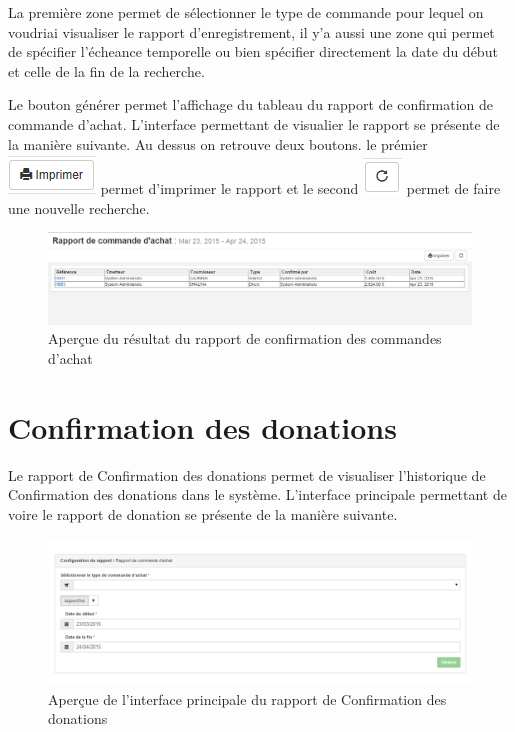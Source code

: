 \documentclass[12pt,a4paper]{report}
\begin{document}
La première zone permet de sélectionner le type de commande pour lequel on voudriai visualiser le rapport d'enregistrement, il y'a aussi une zone qui permet de spécifier l'écheance temporelle  ou bien spécifier directement la date du début et celle de la fin de la recherche. 

Le bouton générer permet l'affichage du tableau du rapport de confirmation de commande d'achat. L'interface permettant de visualier le rapport se présente de la manière suivante. Au dessus on retrouve deux boutons. le prémier 
\includegraphics[scale=0.7]{pic/Print.png} permet d'imprimer le rapport et le second \includegraphics[scale=0.7]{pic/refresh.png} permet de faire une nouvelle recherche.

\begin{figure}[h]
\begin{center}
\includegraphics[width=12cm]{pic/RapportCommAchat.png}
\end{center}
\caption{Aperçue du résultat du rapport de confirmation des commandes d'achat}
\label{Aperçue du résultat du rapport de confirmation des commandes d'achat}
\end{figure}

\newpage
\section{Confirmation des donations}
Le rapport de Confirmation des donations permet de visualiser l'historique de Confirmation des donations dans le système. L'interface principale permettant de voire le rapport de donation se présente de la manière suivante. 

\begin{figure}[h]
\begin{center}
\includegraphics[width=14cm]{pic/RapConfPO.png}
\end{center}
\caption{Aperçue de l'interface principale du rapport de Confirmation des donations}
\label{Aperçue de l'interface principale du rapport de Confirmation des donations}
\end{figure}
\end{document}
